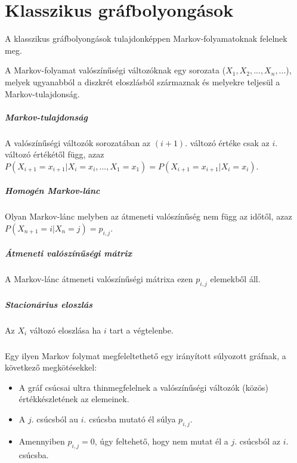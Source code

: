 \chapter{Klasszikus gráfbolyongások}

A klasszikus gráfbolyongások tulajdonképpen Markov-folyamatoknak felelnek meg.

A Markov-folyamat valószínűségi változóknak egy sorozata ($X_1, X_2, ..., X_n,
  ...$), melyek ugyanabból a diszkrét eloszlásból származnak és melyekre teljesül
a Markov-tulajdonság.

\paragraph{Markov-tulajdonság} A valószínűségi változók sorozatában az $(i+1).$
változó értéke csak az $i.$ változó értékétől függ, azaz $P(X_{i+1} = x_{i+1} |
  X_i = x_i, ..., X_1 = x_1) = P(X_{i+1} = x_{i+1} | X_i = x_i)$.

\paragraph{Homogén Markov-lánc} Olyan Markov-lánc melyben az átmeneti
valószínűség nem függ az időtől, azaz $P(X_{n+1} = i | X_n = j) = p_{i,j}$.

\paragraph{Átmeneti valószínűségi mátrix} A Markov-lánc átmeneti valószínűségi
mátrixa ezen $p_{i,j}$ elemekből áll.

\paragraph{Stacionárius eloszlás} Az $X_i$ változó eloszlása ha $i$ tart a
végtelenbe.

\paragraph{}

Egy ilyen Markov folymat megfeleltethető egy irányított súlyozott gráfnak,
a következő megkötésekkel:

\begin{itemize}
  \item A gráf csúcsai ultra thinmegfelelnek a valószínűségi változók (közös)
        értékkészletének az elemeinek.
  \item A $j.$ csúcsból au $i.$ csúcsba mutató él súlya $p_{i,j}$.
  \item Amennyiben $p_{i,j}=0$, úgy feltehető, hogy nem mutat él a $j.$
        csúcsból az $i.$ csúcsba.
\end{itemize}


